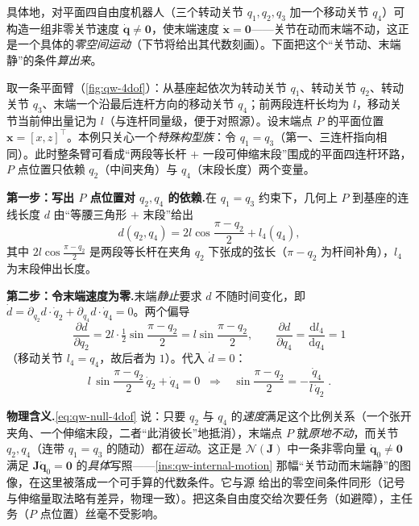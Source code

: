 具体地，对平面四自由度机器人（三个转动关节 $q_1,q_2,q_3$ 加一个移动关节 $q_4$）可构造一组非零关节速度 $\dot{\boldsymbol{q}}\neq\mathbf{0}$，使末端速度 $\dot{\boldsymbol{x}}=\mathbf{0}$——关节在动而末端不动，这正是一个具体的\emph{零空间运动}（下节将给出其代数刻画）。下面把这个“关节动、末端静”的条件\emph{算出来}。

\begin{example}[平面四自由度机器人的一条零空间运动]\label{exam:qw-4dof-null}
取一条平面臂（\cref{fig:qw-4dof}）：从基座起依次为转动关节 $q_1$、转动关节 $q_2$、转动关节 $q_3$、末端一个沿最后连杆方向的移动关节 $q_4$；前两段连杆长均为 $l$，移动关节当前伸出量记为 $l$（与连杆同量级，便于对照源\cite{yu2021quadruped}）。设末端点 $P$ 的平面位置 $\boldsymbol{x}=[x,z]^\top$。本例只关心一个\emph{特殊构型族}：令 $q_1=q_3$（第一、三连杆指向相同）。此时整条臂可看成“两段等长杆 $+$ 一段可伸缩末段”围成的平面四连杆环路，$P$ 点位置只依赖 $q_2$（中间夹角）与 $q_4$（末段长度）两个变量。

\textbf{第一步：写出 $P$ 点位置对 $q_2,q_4$ 的依赖.}\;在 $q_1=q_3$ 约束下，几何上 $P$ 到基座的连线长度 $d$ 由“等腰三角形 $+$ 末段”给出
\[
  d(q_2,q_4)=2l\cos\!\frac{\pi-q_2}{2}+l_4(q_4),
\]
其中 $2l\cos\frac{\pi-q_2}{2}$ 是两段等长杆在夹角 $q_2$ 下张成的弦长（$\pi-q_2$ 为杆间补角），$l_4$ 为末段伸出长度。

\textbf{第二步：令末端速度为零.}\;末端\emph{静止}要求 $d$ 不随时间变化，即 $\dot d=\partial_{q_2}d\cdot\dot q_2+\partial_{q_4}d\cdot\dot q_4=0$。两个偏导
\[
  \frac{\partial d}{\partial q_2}=2l\cdot\tfrac12\sin\!\frac{\pi-q_2}{2}=l\sin\!\frac{\pi-q_2}{2},
  \qquad
  \frac{\partial d}{\partial q_4}=\frac{\mathrm{d}l_4}{\mathrm{d}q_4}=1
\]
（移动关节 $l_4=q_4$，故后者为 $1$）。代入 $\dot d=0$：
\begin{equation}
  l\,\sin\!\frac{\pi-q_2}{2}\,\dot q_2+\dot q_4=0
  \;\;\Longrightarrow\;\;
  \boxed{\;\sin\!\frac{\pi-q_2}{2}=-\frac{\dot q_4}{l\,\dot q_2}\;}.
  \label{eq:qw-null-4dof}
\end{equation}

\textbf{物理含义.}\;\cref{eq:qw-null-4dof} 说：只要 $q_2$ 与 $q_4$ 的\emph{速度}满足这个比例关系（一个张开夹角、一个伸缩末段，二者“此消彼长”地抵消），末端点 $P$ 就\emph{原地不动}，而关节 $q_2,q_4$（连带 $q_1=q_3$ 的随动）都在\emph{运动}。这正是 $\mathcal{N}(\boldsymbol{J})$ 中一条非零向量 $\dot{\boldsymbol{q}}_0\neq\mathbf{0}$ 满足 $\boldsymbol{J}\dot{\boldsymbol{q}}_0=\mathbf{0}$ 的\emph{具体}写照——\cref{ins:qw-internal-motion} 那幅“关节动而末端静”的图像，在这里被落成一个可手算的代数条件。它与源\cite{yu2021quadruped} 给出的零空间条件同形（记号与伸缩量取法略有差异，物理一致）。把这条自由度交给次要任务（如避障），主任务（$P$ 点位置）丝毫不受影响。
\end{example}

